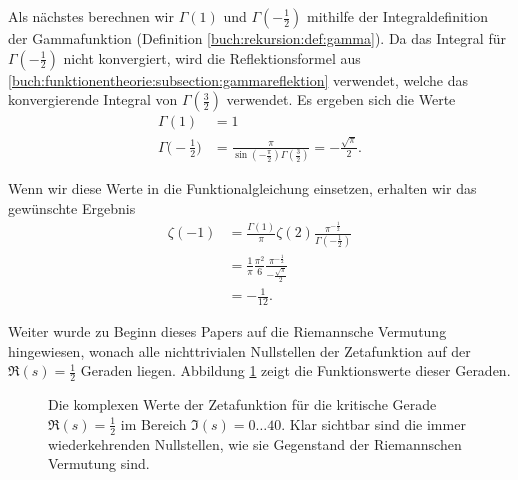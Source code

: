 Als nächstes berechnen wir $\Gamma(1)$ und $\Gamma(-\frac{1}{2})$ mithilfe der Integraldefinition der Gammafunktion (Definition \ref{buch:rekursion:def:gamma}).
Da das Integral für $\Gamma(-\frac{1}{2})$ nicht konvergiert, wird die Reflektionsformel aus \ref{buch:funktionentheorie:subsection:gammareflektion} verwendet, welche das konvergierende Integral von  $\Gamma\left(\frac{3}{2}\right)$ verwendet.
Es ergeben sich die Werte
\begin{align*}
    \Gamma(1)
    &= 1\\
    \Gamma\biggl(-\frac{1}{2}\biggr)
    &= \frac{\pi}{\sin\left(-\frac{\pi}{2}\right)
    \Gamma\left(\frac{3}{2}\right)}
    = -\frac{\sqrt{\pi}}{2}.
\end{align*}

Wenn wir diese Werte in die Funktionalgleichung einsetzen, erhalten wir das gewünschte Ergebnis
\begin{align*}
    \zeta(-1)
    &=
    \frac{\Gamma(1)}{\pi}
    \zeta(2)
    \frac{\pi^{-\frac{1}{2}}}{\Gamma \left( -\frac{1}{2} \right)}
    \\
    &=
    \frac{1}{\pi}
    \frac{\pi^2}{6}
    \frac{\pi^{-\frac{1}{2}}}{
    -\frac{\sqrt{\pi}}{2}}
    \\
    &=
    -\frac{1}{12}.
\end{align*}

Weiter wurde zu Beginn dieses Papers auf die Riemannsche Vermutung hingewiesen, wonach alle nichttrivialen Nullstellen der Zetafunktion auf der $\Re(s)=\frac{1}{2}$ Geraden liegen.
Abbildung \ref{zeta:fig:einzweitel} zeigt die Funktionswerte dieser Geraden.
\begin{figure}
    \centering
    
    \caption{Die komplexen Werte der Zetafunktion für die kritische Gerade $\Re(s)=\frac{1}{2}$ im Bereich $\Im(s) = 0\dots40$.
    Klar sichtbar sind die immer wiederkehrenden Nullstellen, wie sie Gegenstand der Riemannschen Vermutung sind.}
    \label{zeta:fig:einzweitel}
\end{figure}
